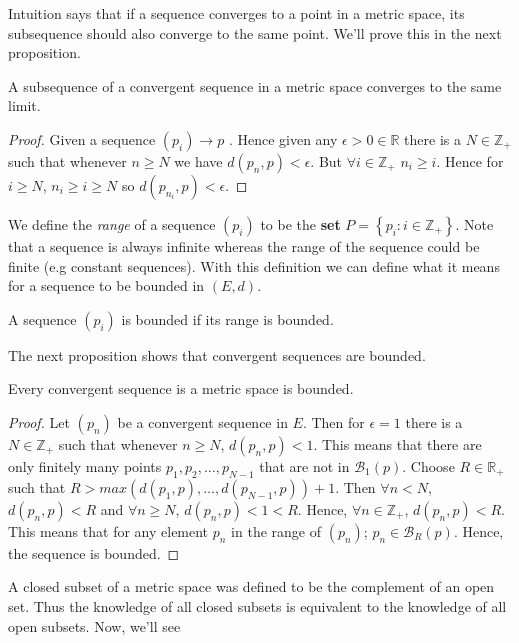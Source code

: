 Intuition says that if a sequence converges to a point in a metric space, its subsequence 
should also converge to the same point. We'll prove this in the next proposition. 
\begin{Proposition}[name=Convergence of a subsequence]
   A subsequence of a convergent sequence in a metric space converges to the same limit. 
\end{Proposition}
\begin{proof}
    Given a sequence $\left(p_i\right) \rightarrow p$ . Hence given any $\epsilon > 0 \in
\mathbb{R}$ there is a $N \in \mathbb{Z}_+$ such that whenever $n \geq N$ we have $d(p_n,p) <
\epsilon$. But $\forall i \in \mathbb{Z}_+$ $n_i \geq i$.  
Hence for $i \geq N$, $n_i \geq i \geq N$ so $d(p_{n_i},p) < \epsilon$. 
\end{proof}
We define the \emph{range} of a sequence $\left(p_i\right)$ to be the \textbf{set} $P = \left\lbrace
    p_i : i \in \mathbb{Z}_+ \right\rbrace$. Note that a sequence is always infinite whereas the
range of the sequence could be finite (e.g constant sequences). With this definition we can 
define what it means for a sequence to be bounded in $(E,d)$.
\begin{Definition}
    A sequence $\left(p_i\right)$ is bounded if its range is bounded.
\end{Definition}
The next proposition shows that convergent sequences are bounded.
\begin{Proposition}[name=Boundedness of convergent sequences]
    Every convergent sequence is a metric space is bounded.
\end{Proposition}
\begin{proof}
    Let $\left(p_n\right)$ be a convergent sequence in $E$. Then for $\epsilon = 1$ there is a
    $N \in \mathbb{Z}_+$ such that whenever $n \geq N$, $d(p_n,p) < 1$. This means that there
   are only finitely many points $p_1,p_2,\dots,p_{N-1}$ that are not in $\mathcal{B}_1(p)$. Choose
  $R \in \mathbb{R}_+$ such that 
  $R > max(d(p_1,p),\dots,d(p_{N-1},p)) + 1$. Then
 $\forall n < N$, $d(p_n,p) < R$ and $\forall n \geq N$, $d(p_n,p) < 1 < R$. Hence, $\forall n \in
 \mathbb{Z}_+$, $d(p_n,p) < R$. This means that for any element $p_n$ in the range of
 $\left(p_n\right)$; $p_n \in \mathcal{B}_R(p)$. Hence, the sequence is bounded. 
\end{proof}
A closed subset of a metric space was defined to be the complement of an open set. Thus the
knowledge of all closed subsets is equivalent to the knowledge of all open subsets. Now, we'll see
